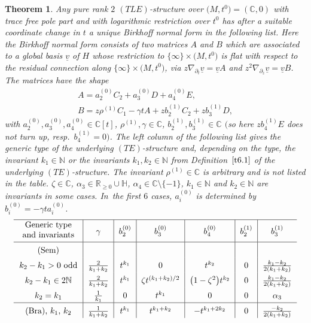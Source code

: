 \documentclass[pdftex]{sigma}%
\numberwithin{equation}{section}
\numberwithin{figure}{section}
\newcommand{\N}{{\mathbb N}}
\newcommand{\C}{{\mathbb C}}
\newcommand{\R}{{\mathbb R}}
\renewcommand{\H}{{\mathbb H}}
\newcommand{\uuuu}{\underline}
\newcommand{\paa}{\partial}
\newcommand{\nnn}{\nabla}
\newtheorem{Theorem}{Theorem}[section]
\begin{document}
\begin{Theorem}\label{t6.3}
Any pure rank $2$ $(TLE)$-structure over $\big(M,t^0\big)=(\C,0)$
with trace free pole part and with logarithmic
restriction over $t^0$ has after a suitable coordinate change
in $t$ a unique Birkhoff normal form in the following list.
Here the Birkhoff normal form
consists of two matrices $A$ and $B$ which are associated
to a global basis $\uuuu{v}$ of $H$ whose restriction to
$\{\infty\}\times \big(M,t^0\big)$ is flat with
respect to the residual connection along
$\{\infty\}\times \big(M,t^0\big)$, via
$z\nnn_{\paa_t}\uuuu{v}=\uuuu{v}A$ and
\mbox{$z^2\nnn_{\paa_z}\uuuu{v}=\uuuu{v}B$}.
The matrices have the shape
\begin{gather}
A=a_2^{(0)}C_2+a_3^{(0)}D+a_4^{(0)}E,\nonumber
\\
B=z\rho^{(1)}C_1-\gamma tA
+zb_2^{(1)}C_2+zb_3^{(1)}D,\label{6.19}%
\end{gather}
with $a_2^{(0)},a_3^{(0)},a_4^{(0)}\in\C[t]$,
$\rho^{(1)},\gamma\in\C$, $b_2^{(1)},b_3^{(1)}\in\C$
$($so here $zb_4^{(1)}E$ does not turn up, resp.~$b_4^{(1)}\allowbreak=0)$.
The left column of the following list gives the
generic type of the
underlying $(TE)$-structure and, depending on the type,
the invariant $k_1\in\N$ or the invariants $k_1,k_2\in\N$
from Definition~$\ref{t6.1}$ of the underlying $(TE)$-structure.
The invariant $\rho^{(1)}\in \C$ is arbitrary and
is not listed in the table.
$\zeta\in\C$, $\alpha_3\in \R_{\geq 0}\cup\H$,
$\alpha_4\in\C\setminus \{-1\}$, $k_1\in\N$ and $k_2\in\N$
are invariants in some cases. In~the first $6$ cases, $a_i^{(0)}$ is determined by
$b_i^{(0)}=-\gamma t a_i^{(0)}$.
\[
\def\arraystretch{1.5}
\begin{tabular}{c|c|c|c|c|c|c}
\hline
\raisebox{1mm}[3.9ex][2.2ex]{\parbox[c]{25mm}{\centering Generic type and~invariants}} & $\gamma$
& $b_2^{(0)}$ & $b_3^{(0)}$ & $b_4^{(0)}$ &
$b_2^{(1)}$ & $b_3^{(1)}$
\\
\hline
$($Sem$)$ & & & & & &
\\
$k_2-k_1>0$\ odd & $\frac{2}{k_1+k_2}$ &
$t^{k_1}$ & $0$ & $t^{k_2}$ & $0$ & $\frac{k_1-k_2}{2(k_1+k_2)}$
\\
$k_2-k_1\in 2\N$& $\frac{2}{k_1+k_2}$ &
$t^{k_1}$ & $\zeta t^{(k_1+k_2)/2}$ & $\big(1-\zeta^2\big)t^{k_2}$ &
$0$ & $\frac{k_1-k_2}{2(k_1+k_2)}$
\\
$k_2=k_1$ & $\frac{1}{k_1}$ & $0$ & $t^{k_1}$ & $0$ &
$0$ & $\alpha_3$
\\
\hline
$($Bra$)$, $k_1$, $k_2$ & $\frac{1}{k_1+k_2}$ & $t^{k_1}$ &
$t^{k_1+k_2}$ & $-t^{k_1+2k_2}$ & $0$ & $\frac{-k_2}{2(k_1+k_2)}$

\end{tabular}\]
\end{Theorem}
\end{document}

